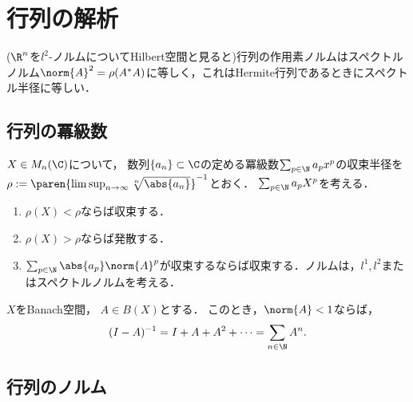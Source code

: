 \documentclass[uplatex, dvipdfmx]{jsreport}
\begin{document}
\section{行列の解析}

\begin{tcolorbox}[colframe=ForestGreen, colback=ForestGreen!10!white,breakable,colbacktitle=ForestGreen!40!white,coltitle=black,fonttitle=\bfseries\sffamily,
title=]
    ($\R^n$を$l^2$-ノルムについてHilbert空間と見ると)行列の作用素ノルムはスペクトルノルム$\norm{A}^2=\rho(A^*A)$に等しく，これはHermite行列であるときにスペクトル半径に等しい．
\end{tcolorbox}

\subsection{行列の冪級数}

\begin{theorem}[行列の冪級数の収束半径]
    $X\in M_n(\C)$について，
    数列$\{a_n\}\subset\C$の定める冪級数$\sum_{p\in\N}a_px^p$の収束半径を$\rho:=\paren{\limsup_{n\to\infty}\sqrt[n]{\abs{a_n}}}^{-1}$とおく．
    $\sum_{p\in\N}a_pX^p$を考える．
    \begin{enumerate}
        \item $\rho(X)<\rho$ならば収束する．
        \item $\rho(X)>\rho$ならば発散する．
        \item $\sum_{p\in\N}\abs{a_p}\norm{A}^p$が収束するならば収束する．ノルムは，$l^1,l^2$またはスペクトルノルムを考える．
    \end{enumerate}
\end{theorem}

\begin{theorem}
    $X$をBanach空間，
    $A\in B(X)$とする．
    このとき，$\norm{A}<1$ならば，
    \[(I-A)^{-1}=I+A+A^2+\cdots=\sum_{n\in\N}A^n.\]
\end{theorem}

\subsection{行列のノルム}
\end{document}
